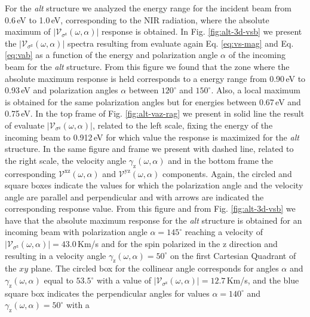 \documentclass[prb,11pt,tightenlines,twocolumn,aps]{revtex4-1}
\begin{document}
For the \emph{alt} structure we analyzed the energy range for the incident beam
from 0.6\,eV to 1.0\,eV, corresponding to the NIR radiation, where the absolute
maximum of $|\mathcal{V}_{\sigma^{\mathrm{z}}}(\omega,\alpha)|$ response is
obtained.
% 
In Fig. \ref{fig:alt-3d-vsb} we present the
$|\mathcal{V}_{\sigma^{\mathrm{z}}}(\omega,\alpha)|$ spectra resulting from
evaluate again Eq. \eqref{eq:vs-mag} and Eq. \eqref{eq:vab} as a function of the
energy and polarization angle $\alpha$ of the incoming beam for the \emph{alt}
structure.
% 
From this figure we found that the zone where the absolute maximum response is
held corresponds to a energy range from 0.90\,eV to 0.93\,eV and polarization
angles $\alpha$ between $120^{\circ}$ and $150^{\circ}$. Also, a local maximum
is obtained for the same polarization angles but for energies between 0.67\,eV
and 0.75\,eV.
In the top frame of Fig. \ref{fig:alt-vaz-rag} we present in solid line the
result of evaluate $|\mathcal{V}_{\sigma^{\mathrm{z}}}(\omega,\alpha)|$, related
to the left scale, fixing the energy of the incoming beam to 0.912\,eV for which
value the response is maximized for the \emph{alt} structure. In the same figure
and frame we present with dashed line, related to the right scale, the velocity
angle $\gamma_{\mathrm{z}}(\omega,\alpha)$ and in the bottom frame the
corresponding $\mathcal{V}^{\mathrm{xz}}(\omega,\alpha)$ and
$\mathcal{V}^{\mathrm{yz}}(\omega,\alpha)$ components. Again, the circled and
square boxes indicate the values for which the polarization angle and the
velocity angle are parallel and perpendicular and with arrows are indicated the
corresponding response value.
% 
From this figure and from Fig. \ref{fig:alt-3d-vsb} we have that the absolute
maximum response for the \emph{alt} structure is obtained for an incoming beam
with polarization angle $\alpha=145^{\circ}$ reaching a velocity of
$|\mathcal{V}_{\sigma^{\mathrm{z}}}(\omega,\alpha)|=43.0$\,Km/s and for the spin
polarized in the $\mathrm{z}$ direction and resulting in a velocity angle
$\gamma_{\mathrm{z}}(\omega,\alpha)=50^{\circ}$ on the first Cartesian Quadrant
of the $xy$ plane. The circled box for the collinear angle corresponds for
angles $\alpha$ and $\gamma_{\mathrm{z}}(\omega,\alpha)$ equal to $53.5^{\circ}$
with a value of $|\mathcal{V}_{\sigma^{\mathrm{z}}}(\omega,\alpha)|=12.7$\,Km/s,
and the blue square box indicates the perpendicular angles for values
$\alpha=140^{\circ}$ and $\gamma_{\mathrm{z}}(\omega,\alpha)=50^{\circ}$ with a
\end{document}
